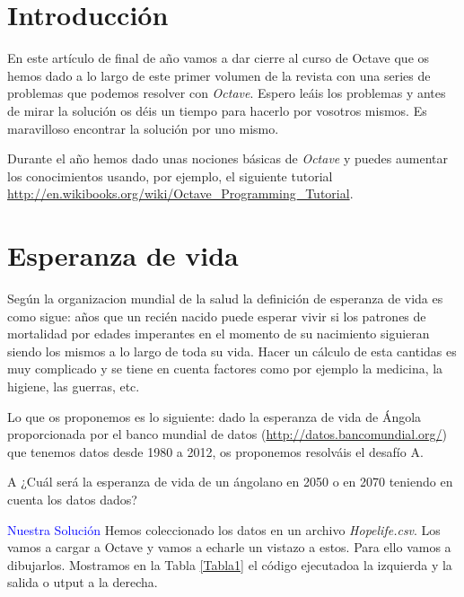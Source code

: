 \section*{Introducción}

En este artículo de final de año vamos a dar cierre al curso de Octave
que os hemos dado a lo largo de este primer volumen de la revista con 
una series de problemas que podemos resolver con \emph{Octave}. Espero leáis 
los problemas y antes de mirar la solución os déis un tiempo para hacerlo
por vosotros mismos. Es maravilloso encontrar la solución por uno
mismo. 

Durante el año hemos dado unas nociones básicas  de \emph{Octave} y puedes 
aumentar los conocimientos usando, por ejemplo, el siguiente tutorial
\url{http://en.wikibooks.org/wiki/Octave_Programming_Tutorial}.

\section{Esperanza de vida}
 
Según la organizacion mundial de la salud la definición de esperanza de vida 
es como sigue: años que un recién nacido puede esperar vivir si los patrones
de mortalidad por edades imperantes en el momento de su nacimiento siguieran
siendo los mismos a lo largo de toda su vida. Hacer un cálculo de esta cantidas 
es muy complicado y se tiene en cuenta factores como por ejemplo la medicina,
la higiene, las guerras, etc.

Lo que os proponemos es lo siguiente: dado la esperanza de vida de Ángola 
proporcionada por el banco mundial de datos (\url{http://datos.bancomundial.org/})
que tenemos datos desde 1980 a 2012, os proponemos resolváis el desafío A.

\begin{mybox}
\cappar A  ¿Cuál será la esperanza de vida de un ángolano en 2050 o en 2070 teniendo en cuenta
los datos dados?
\vspace{1.5cm}
\end{mybox}

\textcolor{blue}{\Large Nuestra Solución}
Hemos coleccionado los datos en un archivo \emph{Hopelife.csv}. Los vamos a cargar a Octave
y vamos a echarle un vistazo a estos. Para ello vamos a dibujarlos. Mostramos en la Tabla \ref{Tabla1}
el código ejecutadoa la izquierda y la salida o utput a la derecha.





\newpage




